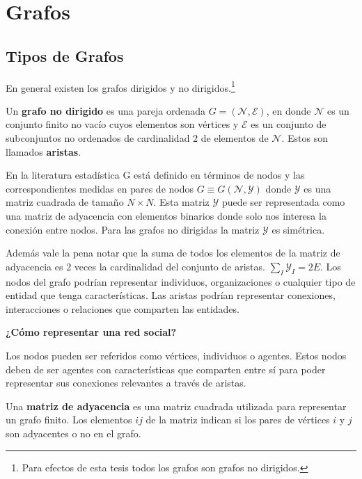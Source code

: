 \chapter{Grafos}
\label{ch:preliminaries}

\section{Tipos de Grafos}

En general existen los grafos dirigidos y no dirigidos.\footnote{Para efectos de esta tesis todos los grafos son grafos no dirigidos.}


\begin{definition}
\label{grafo_def}
Un \textbf{grafo no dirigido} es una pareja ordenada $ G = (\mathcal{N}, \mathcal{E})$, en donde $\mathcal{N}$ es un conjunto finito no vacío cuyos elementos son vértices y $\mathcal{E}$ es un conjunto de subconjuntos no ordenados de cardinalidad $2$ de elementos de $\mathcal{N}$.  Estos son llamados \textbf{aristas}. 

\end{definition}

En la literatura estadística G está definido en términos de nodos y las correspondientes medidas en pares de nodos $G \equiv G ( \mathcal { N } , \mathcal { Y } )$ donde $\mathcal{Y}$ es una matriz cuadrada de tamaño $N \times N$. Esta matriz $\mathcal{Y}$ puede ser representada como una matriz de adyacencia con elementos binarios donde solo nos interesa la conexión entre nodos. Para las grafos no dirigidas la matriz $\mathcal{Y}$ es simétrica. 

Además vale la pena notar que la suma de todos los elementos de la matriz de adyacencia es 2 veces la cardinalidad del conjunto de aristas. $\sum _I \mathcal{Y}_{I} = 2E$. Los nodos del grafo podrían representar individuos, organizaciones o cualquier tipo de entidad que tenga características. Las aristas podrían representar conexiones, interacciones o relaciones que comparten las entidades.

\textbf{¿Cómo representar una red social?}

Los nodos pueden ser referidos como vértices, individuos o agentes. Estos nodos deben de ser agentes con características que comparten entre sí para poder representar sus conexiones relevantes a través de aristas.


\begin{definition}
Una \textbf{matriz de adyacencia} es una matriz cuadrada utilizada para representar un grafo finito. Los elementos $ij$ de la matriz indican si los pares de vértices $i$ y $j$ son adyacentes o no en el grafo.

\end{definition}

